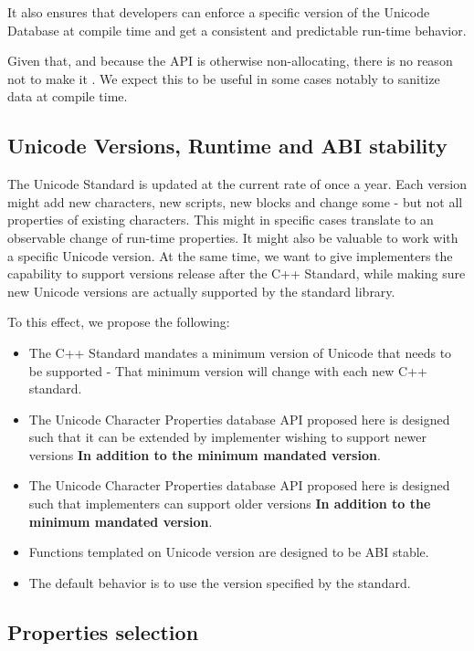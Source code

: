 \documentclass{wg21}
\begin{document}
It also ensures that developers can enforce a specific version of the Unicode Database at compile time and get a
consistent and predictable run-time behavior.

Given that, and because the API is otherwise non-allocating, there is no reason not to make it .
We expect this to be useful in some cases notably to sanitize data at compile time.


\subsection{Unicode Versions, Runtime and ABI stability}

The Unicode Standard is updated at the current rate of once a year.
Each version might add new characters, new scripts, new blocks and change some - but not all
properties of existing characters.
This might in specific cases translate to an observable change of run-time properties.
It might also be valuable to work with a specific Unicode version.
At the same time, we want to give implementers the capability to support versions release after the C++ Standard,
while making sure new Unicode versions are actually supported by the standard library.

To this effect, we propose the following:

\begin{itemize}
    \item The C++ Standard mandates a minimum version of Unicode that needs to be supported - That minimum version will change with each new C++ standard.
    \item The Unicode Character Properties database API proposed here is designed such that it can be extended by implementer wishing to support newer versions \textbf{In addition to the minimum mandated version}.
    \item The Unicode Character Properties database API proposed here is designed such that implementers can support older versions \textbf{In addition to the minimum mandated version}.
    \item Functions templated on Unicode version are designed to be ABI stable.
    \item The default behavior is to use the version specified by the standard.
\end{itemize}

\subsection{Properties selection}
\end{document}
